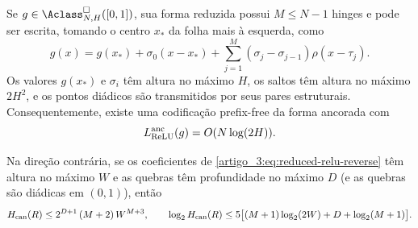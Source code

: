 \begin{proposition}\label{map:artigo_3:5.4}
\label{artigo_3:prop:anchored-relu-code}
Se $g\in\Aclass^\square_{N,H}([0,1])$, sua forma reduzida possui
$M\le N-1$ hinges e pode ser escrita, tomando o centro $x_*$ da folha mais à
esquerda, como
\begin{equation}
 g(x)=g(x_*)+\sigma_0(x-x_*)
      +\sum_{j=1}^{M}(\sigma_j-\sigma_{j-1})\rho(x-\tau_j).
 \label{artigo_3:eq:anchored-relu-form}
\end{equation}
Os valores $g(x_*)$ e $\sigma_i$ têm altura no máximo $H$, os saltos têm
altura no máximo $2H^2$, e os pontos diádicos são transmitidos por seus pares
estruturais. Consequentemente, existe uma codificação prefix-free da forma
ancorada com
\begin{equation}
 L_{\rm ReLU}^{\rm anc}(g)=O(N\log(2H)).
 \label{artigo_3:eq:anchored-network-bits}
\end{equation}

Na direção contrária, se os coeficientes de
\eqref{artigo_3:eq:reduced-relu-reverse} têm altura no máximo $W$ e as quebras têm
profundidade no máximo $D$ (e as quebras são diádicas em $(0,1)$), então
\begin{equation}
 H_{\rm can}(R)\le 2^{D+1}\,(M+2)\,W^{M+3},
 \qquad
 \log_2 H_{\rm can}(R)
 \le 5\bigl[(M+1)\log_2(2W)+D+\log_2(M+1)\bigr].
 \label{artigo_3:eq:reverse-height-bit-bound}
\end{equation}
\end{proposition}

